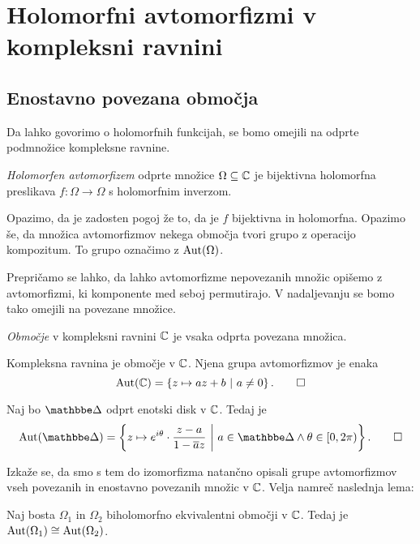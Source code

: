 \section{Holomorfni avtomorfizmi v kompleksni ravnini}

\subsection{Enostavno povezana območja}

Da lahko govorimo o holomorfnih funkcijah, se bomo omejili na
odprte podmnožice kompleksne ravnine.

\begin{definicija}
\emph{Holomorfen avtomorfizem} odprte množice $\Omega \subseteq \mathbb{C}$
je bijektivna holomorfna preslikava $f \colon \Omega \to \Omega$ s
holomorfnim inverzom.
\end{definicija}

Opazimo, da je zadosten pogoj že to, da je $f$ bijektivna in
holomorfna. Opazimo še, da množica avtomorfizmov nekega območja
tvori grupo z operacijo kompozitum. To grupo označimo z
$\operatorname{Aut}(\Omega)$.

Prepričamo se lahko, da lahko avtomorfizme nepovezanih množic
opišemo z avtomorfizmi, ki komponente med seboj permutirajo. V
nadaljevanju se bomo tako omejili na povezane množice.

\begin{definicija}
\emph{Območje} v kompleksni ravnini $\mathbb{C}$ je vsaka odprta povezana
množica.
\end{definicija}

\begin{primer}
Kompleksna ravnina je območje v $\mathbb{C}$. Njena grupa avtomorfizmov
je enaka
\[
\operatorname{Aut}(\mathbb{C}) = \left\{z \mapsto az + b~\middle\vert~a \ne 0\right\}. \qedhere
\]
\end{primer}

\begin{primer}
Naj bo $\dsk$ odprt enotski disk v $\mathbb{C}$. Tedaj je
\[
\Aut(\dsk) =
\setb{z \mapsto e^{i \theta} \cdot \frac{z-a}{1 - \oline{a} z}}
{a \in \dsk \land \theta \in [0, 2\pi)}. \qedhere
\]
\end{primer}



Izkaže se, da smo s tem do izomorfizma natančno opisali grupe
avtomorfizmov vseh povezanih in enostavno povezanih množic v $\mathbb{C}$.
Velja namreč naslednja lema:

\begin{lema}
Naj bosta $\Omega_1$ in $\Omega_2$ biholomorfno ekvivalentni
območji v $\mathbb{C}$. Tedaj je $\operatorname{Aut}(\Omega_1) \cong \operatorname{Aut}(\Omega_2)$.
\end{lema}

